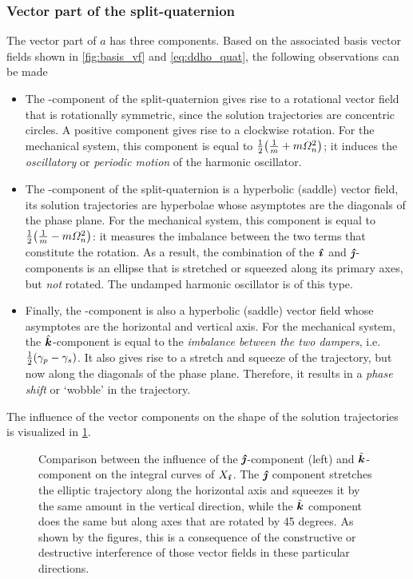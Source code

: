 \subsubsection{Vector part of the split-quaternion} 
The vector part of $a$ has three components. Based on the associated basis vector fields shown in \cref{fig:basis_vf} and \cref{eq:ddho_quat}, the following observations can be made
\begin{itemize}
    \item The \quati-component of the split-quaternion gives rise to a rotational vector field that is rotationally symmetric, since the solution trajectories are concentric circles. A positive component gives rise to a clockwise rotation. For the mechanical system, this component is equal to $\frac{1}{2}\qty(\tfrac{1}{m} + m\Omega_n^2)$; it induces the \emph{oscillatory} or \emph{periodic motion} of the harmonic oscillator.
    \item The \quatj-component of the split-quaternion is a hyperbolic (saddle) vector field, its solution trajectories are hyperbolae whose asymptotes are the diagonals of the phase plane. For the mechanical system, this component is equal to $\tfrac{1}{2}\qty(\tfrac{1}{m} - m\Omega_n^2)$: it measures the imbalance between the two terms that constitute the rotation. As a result, the combination of the $\quati$ and $\quatj$-components is an ellipse that is stretched or squeezed along its primary axes, but \emph{not} rotated. The undamped harmonic oscillator is of this type.
    \item Finally, the \quatk-component is also a hyperbolic (saddle) vector field whose asymptotes are the horizontal and vertical axis. For the mechanical system, the $\quatk$-component is equal to the \emph{imbalance between the two dampers}, i.e. $\frac{1}{2}\qty(\gamma_p - \gamma_s)$. It also gives rise to a stretch and squeeze of the trajectory, but now along the diagonals of the phase plane. Therefore, it results in a \emph{phase shift} or `wobble' in the trajectory.
\end{itemize}
The influence of the vector components on the shape of the solution trajectories is visualized in \cref{fig:vector_components}.

\begin{figure}[ht]
    \centering
    
    \caption{Comparison between the influence of the $\quatj$-component (left) and $\quatk$-component on the integral curves of $X_\quati$. The $\quatj$ component stretches the elliptic trajectory along the horizontal axis and squeezes it by the same amount in the vertical direction, while the $\quatk$ component does the same but along axes that are rotated by 45 degrees. As shown by the figures, this is a consequence of the constructive or destructive interference of those vector fields in these particular directions.}
    \label{fig:vector_components}
\end{figure}

